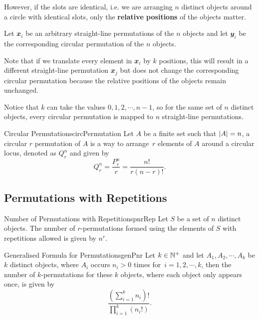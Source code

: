 \documentclass[math]{amznotes}
\theoremstyle{remark}
\begin{document}
However, if the slots are identical, i.e. we are arranging $n$ distinct objects around a circle with identical slots, only the \textbf{relative positions} of the objects matter.

Let $\mathbfit{x}_i$ be an arbitrary straight-line permutations of the $n$ objects and let $\mathbfit{y}_i$ be the corresponding circular permutation of the $n$ objects.

Note that if we translate every element in $\mathbfit{x}_i$ by $k$ positions, this will result in a different straight-line permutation $\mathbfit{x}_j$ but does not change the corresponding circular permutation because the relative positions of the objects remain unchanged.

Notice that $k$ can take the values $0, 1, 2, \cdots, n - 1$, so for the same set of $n$ distinct objects, every circular permutation is mapped to $n$ straight-line permutations.
\begin{dfnbox}{Circular Permutations}{circPermutation}
    Let $A$ be a finite set such that ${\left\lvert {A} \right\rvert} = n$, a circular $r$ permutation of $A$ is a way to arrange~$r$ elements of $A$ around a circular locus, denoted as $Q^n_r$ and given by
    \begin{equation*}
        Q^n_r = \frac{P^n_r}{r} = \frac{n!}{r(n - r)!}.
    \end{equation*}
\end{dfnbox}

\subsection{Permutations with Repetitions}
\begin{probox}{Number of Permutations with Repetitions}{pnrRep}
    Let $S$ be a set of $n$ distinct objects. The number of $r$-permutations formed using the elements of $S$ with repetitions allowed is given by $n^r$.
\end{probox}

\begin{probox}{Generalised Formula for Permutations}{genPnr}
    Let $k \in \mathbb{N}^+$ and let $A_1, A_2, \cdots, A_k$ be $k$ distinct objects, where $A_i$ occurs $n_i > 0$ times for~$i = 1, 2, \cdots, k$, then the number of $k$-permutations for these $k$ objects, where each object only appears once, is given by
    \begin{equation*}
        \frac{\left(\sum_{i = 1}^{k}n_i\right)!}{\prod_{i = 1}^{k}\left(n_i!\right)}.
    \end{equation*}
\end{probox}
\end{document}
